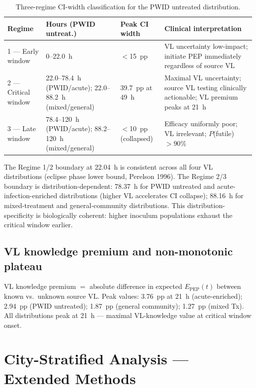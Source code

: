 \documentclass[11pt]{article}
\theoremstyle{definition}
\theoremstyle{remark}
\newcommand{\Epep}{E_{\text{PEP}}}
\begin{document}
\begin{table}[H]
\centering
\small
\caption{Three-regime CI-width classification for the PWID untreated distribution.}
\begin{tabular}{@{}lp{4cm}lp{5cm}@{}}
\toprule
\textbf{Regime} & \textbf{Hours (PWID untreat.)} & \textbf{Peak CI width} & \textbf{Clinical interpretation} \\
\midrule
1 --- Early window & 0--22.0~h & $<$15~pp & VL uncertainty low-impact; initiate PEP immediately regardless of source VL \\
2 --- Critical window & 22.0--78.4~h (PWID/acute); 22.0--88.2~h (mixed/general) & 39.7~pp at 49~h & Maximal VL uncertainty; source VL testing clinically actionable; VL premium peaks at 21~h \\
3 --- Late window & 78.4--120~h (PWID/acute); 88.2--120~h (mixed/general) & $<$10~pp (collapsed) & Efficacy uniformly poor; VL irrelevant; $P$(futile) $> 90\%$ \\
\bottomrule
\end{tabular}
\end{table}

The Regime 1/2 boundary at 22.04~h is consistent across all four VL distributions (eclipse phase lower bound, Perelson 1996). The Regime 2/3 boundary is distribution-dependent: 78.37~h for PWID untreated and acute-infection-enriched distributions (higher VL accelerates CI collapse); 88.16~h for mixed-treatment and general-community distributions. This distribution-specificity is biologically coherent: higher inoculum populations exhaust the critical window earlier.

\subsection{VL knowledge premium and non-monotonic plateau}

VL knowledge premium $=$ absolute difference in expected $\Epep(t)$ between known vs.\ unknown source VL. Peak values: 3.76~pp at 21~h (acute-enriched); 2.94~pp (PWID untreated); 1.87~pp (general community); 1.27~pp (mixed Tx). All distributions peak at 21~h --- maximal VL-knowledge value at critical window onset.

\section{City-Stratified Analysis --- Extended Methods}
\end{document}
